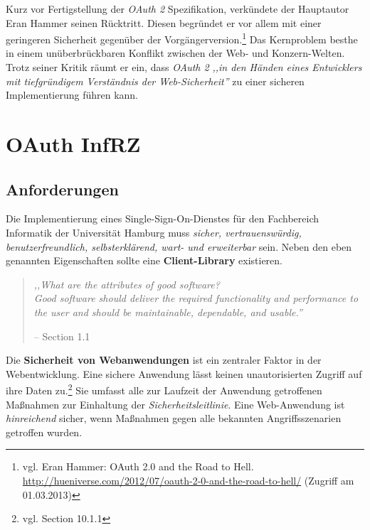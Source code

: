 \documentclass[12pt,a4paper,pointednumbers,abstracton]{scrartcl}
\begin{document}
Kurz vor Fertigstellung der \emph{OAuth 2} Spezifikation, verkündete der Hauptautor Eran Hammer seinen Rücktritt.
Diesen begründet er vor allem mit einer geringeren Sicherheit gegenüber der Vorgängerversion.\footnote{vgl. Eran Hammer: OAuth 2.0 and the Road to Hell. \url{http://hueniverse.com/2012/07/oauth-2-0-and-the-road-to-hell/} (Zugriff am 01.03.2013)}
Das Kernproblem besthe in einem unüberbrückbaren Konflikt zwischen der Web- und Konzern-Welten.
Trotz seiner Kritik räumt er ein, dass \emph{OAuth 2} \emph{,,in den Händen eines Entwicklers mit tiefgründigem Verständnis der Web-Sicherheit''} zu einer sicheren Implementierung führen kann.


\newpage
\section{OAuth InfRZ}
\label{sec:oauth-infrz}

\subsection{Anforderungen}
\label{sec:oauth-infrz/requirements}

Die Implementierung eines Single-Sign-On-Dienstes für den Fachbereich Informatik der Universität Hamburg muss \emph{sicher, vertrauenswürdig, benutzerfreundlich, selbsterklärend, wart- und erweiterbar} sein.
Neben den eben genannten Eigenschaften sollte eine \textbf{Client-Library} existieren.

\begin{quote}
\emph{,,What are the attributes of good software?\\
Good software should deliver the required functionality and performance to the user and should be maintainable, dependable, and usable.''}
\begin{flushright}
\small{-- \cite{Som10} Section 1.1}
\end{flushright}
\end{quote}

Die \textbf{Sicherheit von Webanwendungen} ist ein zentraler Faktor in der Webentwicklung.
Eine sichere Anwendung lässt keinen unautorisierten Zugriff auf ihre Daten zu.\footnote{vgl. \cite{Som10} Section 10.1.1}
Sie umfasst alle zur Laufzeit der Anwendung getroffenen Maßnahmen zur Einhaltung der \emph{Sicherheitsleitlinie}.
Eine Web-Anwendung ist \emph{hinreichend} sicher, wenn Maßnahmen gegen alle bekannten Angriffsszenarien getroffen wurden.
\end{document}

